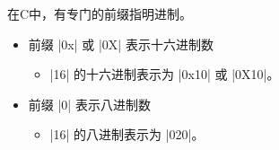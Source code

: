 \begin{frame}[fragile]
在C中，有专门的前缀指明进制。

\begin{itemize}
\item 前缀 \lst|0x| 或 \lst|0X| 表示十六进制数\\[0.1in]
  \begin{itemize}
  \item \lst|16| 的十六进制表示为 \lst|0x10| 或 \lst|0X10|。\\[0.2in]
  \end{itemize}
\item 前缀 \lst|0| 表示八进制数\\[0.1in]
  \begin{itemize}
  \item \lst|16| 的八进制表示为 \lst|020|。
  \end{itemize}
\end{itemize}
\end{frame}


